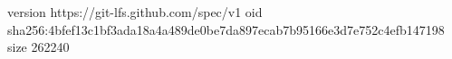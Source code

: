 version https://git-lfs.github.com/spec/v1
oid sha256:4bfef13c1bf3ada18a4a489de0be7da897ecab7b95166e3d7e752c4efb147198
size 262240
